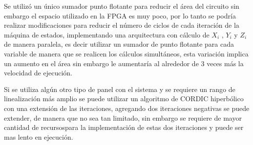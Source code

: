 \begin{compactitem}

\item Se utilizó un único sumador punto flotante para reducir el área del circuito sin embargo el espacio utilizado en la FPGA es muy poco, por lo tanto se podría realizar modificaciones para reducir el número de ciclos de cada iteración de la máquina de estados, implementando una arquitectura con cálculo de $ X_i $ , $ Y_i$ y $ Z_i$ de manera paralela, es decir utilizar un sumador de punto flotante para cada variable de manera que se realicen los cálculos simultáneos, esta variación implica un aumento en el área sin embargo le aumentaría al alrededor de 3 veces más la velocidad de ejecución.

\item Si se utiliza algún otro tipo de panel con el sistema y se requiere un rango de linealización más amplio se puede utilizar un algoritmo de CORDIC hiperbólico con una extensión de las iteraciones, agregando dos iteraciones negativas se puede extender, de manera que no sea tan limitado, sin embargo se requiere de mayor cantidad de recursospara la implementación de estas dos iteraciones y puede ser mas lento en ejecución.  

\end{compactitem}
